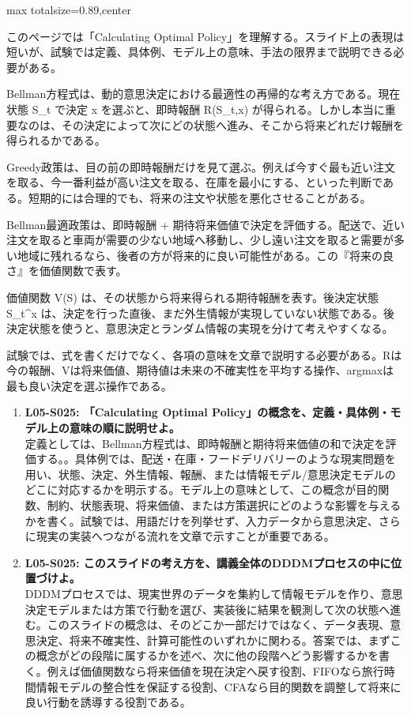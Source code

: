 \begin{minipage}[t]{0.58\textwidth}
\begin{adjustbox}{max totalsize={\textwidth}{0.89\textheight},center}
\begin{minipage}{\textwidth}\scriptsize
{}このページでは「Calculating Optimal Policy」を理解する。スライド上の表現は短いが、試験では定義、具体例、モデル上の意味、手法の限界まで説明できる必要がある。\par
Bellman方程式は、動的意思決定における最適性の再帰的な考え方である。現在状態 S\_t で決定 x を選ぶと、即時報酬 R(S\_t,x) が得られる。しかし本当に重要なのは、その決定によって次にどの状態へ進み、そこから将来どれだけ報酬を得られるかである。\par
Greedy政策は、目の前の即時報酬だけを見て選ぶ。例えば今すぐ最も近い注文を取る、今一番利益が高い注文を取る、在庫を最小にする、といった判断である。短期的には合理的でも、将来の注文や状態を悪化させることがある。\par
Bellman最適政策は、即時報酬 + 期待将来価値で決定を評価する。配送で、近い注文を取ると車両が需要の少ない地域へ移動し、少し遠い注文を取ると需要が多い地域に残れるなら、後者の方が将来的に良い可能性がある。この『将来の良さ』を価値関数で表す。\par
価値関数 V(S) は、その状態から将来得られる期待報酬を表す。後決定状態 S\_t\textasciicircum{}x は、決定を行った直後、まだ外生情報が実現していない状態である。後決定状態を使うと、意思決定とランダム情報の実現を分けて考えやすくなる。\par
試験では、式を書くだけでなく、各項の意味を文章で説明する必要がある。Rは今の報酬、Vは将来価値、期待値は未来の不確実性を平均する操作、argmaxは最も良い決定を選ぶ操作である。\par{}\begin{enumerate}\item \textbf{L05-S025: 「Calculating Optimal Policy」の概念を、定義・具体例・モデル上の意味の順に説明せよ。}\\定義としては、Bellman方程式は、即時報酬と期待将来価値の和で決定を評価する。。具体例では、配送・在庫・フードデリバリーのような現実問題を用い、状態、決定、外生情報、報酬、または情報モデル/意思決定モデルのどこに対応するかを明示する。モデル上の意味として、この概念が目的関数、制約、状態表現、将来価値、または方策選択にどのような影響を与えるかを書く。試験では、用語だけを列挙せず、入力データから意思決定、さらに現実の実装へつながる流れを文章で示すことが重要である。\item \textbf{L05-S025: このスライドの考え方を、講義全体のDDDMプロセスの中に位置づけよ。}\\DDDMプロセスでは、現実世界のデータを集約して情報モデルを作り、意思決定モデルまたは方策で行動を選び、実装後に結果を観測して次の状態へ進む。このスライドの概念は、そのどこか一部だけではなく、データ表現、意思決定、将来不確実性、計算可能性のいずれかに関わる。答案では、まずこの概念がどの段階に属するかを述べ、次に他の段階へどう影響するかを書く。例えば価値関数なら将来価値を現在決定へ戻す役割、FIFOなら旅行時間情報モデルの整合性を保証する役割、CFAなら目的関数を調整して将来に良い行動を誘導する役割である。\end{enumerate}

\end{minipage}
\end{adjustbox}
\end{minipage}
